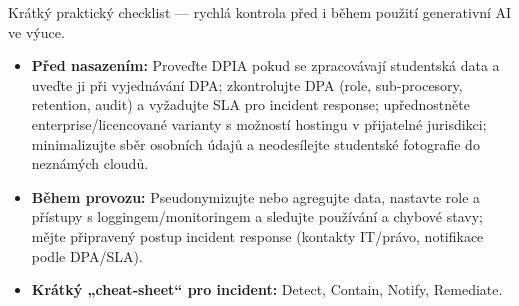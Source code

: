 Krátký praktický checklist — rychlá kontrola před i během použití generativní AI ve výuce.

\begin{itemize}
\item \textbf{Před nasazením:} Proveďte DPIA pokud se zpracovávají studentská data a uveďte ji při vyjednávání DPA;\cite{kb_ai_101_tipu_pdf_04e4a115_page_8_1} zkontrolujte DPA (role, sub‑procesory, retention, audit) a vyžadujte SLA pro incident response;\cite{kb_ai_101_tipu_pdf_04e4a115_page_8_1} upřednostněte enterprise/licencované varianty s možností hostingu v přijatelné jurisdikci;\cite{kb_ai_101_tipu_pdf_04e4a115_page_3_1} minimalizujte sběr osobních údajů a neodesílejte studentské fotografie do neznámých cloudů.\cite{kb_ai_101_tipu_pdf_04e4a115_page_53_2}
\item \textbf{Během provozu:} Pseudonymizujte nebo agregujte data, nastavte role a přístupy s loggingem/monitoringem a sledujte používání a chybové stavy;\cite{kb_ai_101_tipu_pdf_04e4a115_page_8_1} mějte připravený postup incident response (kontakty IT/právo, notifikace podle DPA/SLA).\cite{kb_ai_101_tipu_pdf_04e4a115_page_8_1}
\item \textbf{Krátký „cheat‑sheet“ pro incident:} Detect, Contain, Notify, Remediate.
\end{itemize}